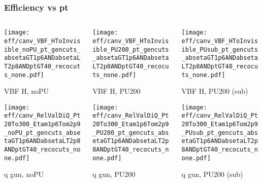 \documentclass[8pt]{beamer}
\begin{document}
 \begin{frame}
  \frametitle{Efficiency vs pt}
  
  \begin{columns}
   \begin{column}{0.35\textwidth}
     \texttt{[image: eff/canv\_VBF\_HToInvisible\_noPU\_pt\_gencuts\_absetaGT1p6ANDabsetaLT2p8ANDptGT40\_recocuts\_none.pdf]}
     
     VBF H, noPU
    
     \texttt{[image: eff/canv\_RelValDiQ\_Pt20To300\_Etam1p6Tom2p9\_noPU\_pt\_gencuts\_absetaGT1p6ANDabsetaLT2p8ANDptGT40\_recocuts\_none.pdf]}
     
     q gun, noPU
   \end{column}
   \begin{column}{0.35\textwidth}
     \texttt{[image: eff/canv\_VBF\_HToInvisible\_PU200\_pt\_gencuts\_absetaGT1p6ANDabsetaLT2p8ANDptGT40\_recocuts\_none.pdf]}
     
     VBF H, PU200
    
     \texttt{[image: eff/canv\_RelValDiQ\_Pt20To300\_Etam1p6Tom2p9\_PU200\_pt\_gencuts\_absetaGT1p6ANDabsetaLT2p8ANDptGT40\_recocuts\_none.pdf]}
     
     q gun, PU200
   \end{column}
   \begin{column}{0.35\textwidth}
     \texttt{[image: eff/canv\_VBF\_HToInvisible\_PUsub\_pt\_gencuts\_absetaGT1p6ANDabsetaLT2p8ANDptGT40\_recocuts\_none.pdf]}
     
     VBF H, PU200 (sub)
    
     \texttt{[image: eff/canv\_RelValDiQ\_Pt20To300\_Etam1p6Tom2p9\_PUsub\_pt\_gencuts\_absetaGT1p6ANDabsetaLT2p8ANDptGT40\_recocuts\_none.pdf]}
     
     q gun, PU200 (sub)
   \end{column}
  \end{columns}
 \end{frame}
 
\end{document}
